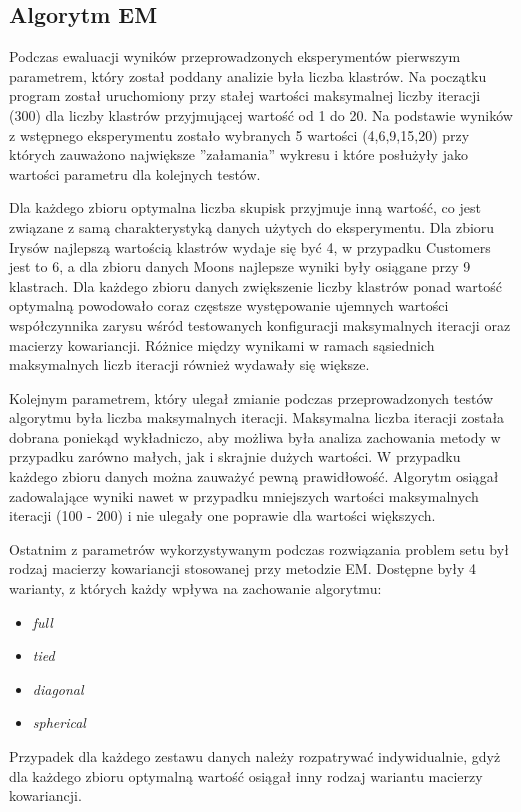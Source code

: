 \documentclass{classrep}
\begin{document}
{        \subsection{Algorytm EM}
        \label{summary_3} {
            Podczas ewaluacji wyników przeprowadzonych eksperymentów pierwszym
            parametrem, który został poddany analizie była liczba klastrów. Na początku
            program został uruchomiony przy stałej wartości maksymalnej liczby iteracji
            (300) dla liczby klastrów przyjmującej wartość od 1 do 20. Na podstawie
            wyników z wstępnego eksperymentu zostało wybranych 5 wartości (4,6,9,15,20)
            przy których zauważono największe ''załamania'' wykresu i które posłużyły
            jako wartości parametru dla kolejnych testów.

            Dla każdego zbioru optymalna liczba skupisk przyjmuje inną wartość, co jest
            związane z samą charakterystyką danych użytych do eksperymentu. Dla zbioru
            Irysów najlepszą wartością klastrów wydaje się być 4, w przypadku Customers
            jest to 6, a dla zbioru danych Moons najlepsze wyniki były osiągane przy 9
            klastrach. Dla każdego zbioru danych zwiększenie liczby klastrów ponad
            wartość optymalną powodowało coraz częstsze występowanie ujemnych wartości
            współczynnika zarysu wśród testowanych konfiguracji maksymalnych iteracji
            oraz macierzy kowariancji. Różnice między wynikami w ramach sąsiednich
            maksymalnych liczb iteracji również wydawały się większe.

            Kolejnym parametrem, który ulegał zmianie podczas przeprowadzonych testów
            algorytmu była liczba maksymalnych iteracji. Maksymalna liczba iteracji
            została dobrana poniekąd wykładniczo, aby możliwa była analiza zachowania
            metody w przypadku zarówno małych, jak i skrajnie dużych wartości. W
            przypadku każdego zbioru danych można zauważyć pewną prawidłowość. Algorytm
            osiągał zadowalające wyniki nawet w przypadku mniejszych wartości
            maksymalnych iteracji (100 - 200) i nie ulegały one poprawie dla wartości
            większych.

            Ostatnim z parametrów wykorzystywanym podczas rozwiązania problem setu był
            rodzaj macierzy kowariancji stosowanej przy metodzie EM. Dostępne były 4
            warianty, z których każdy wpływa na zachowanie algorytmu:
            \begin{itemize}
                \item \textit{full}
                \item \textit{tied}
                \item \textit{diagonal}
                \item \textit{spherical}
            \end{itemize}
            Przypadek dla każdego zestawu danych należy rozpatrywać indywidualnie, gdyż
            dla każdego zbioru optymalną wartość osiągał inny rodzaj wariantu macierzy
            kowariancji.
        }

}
\end{document}
